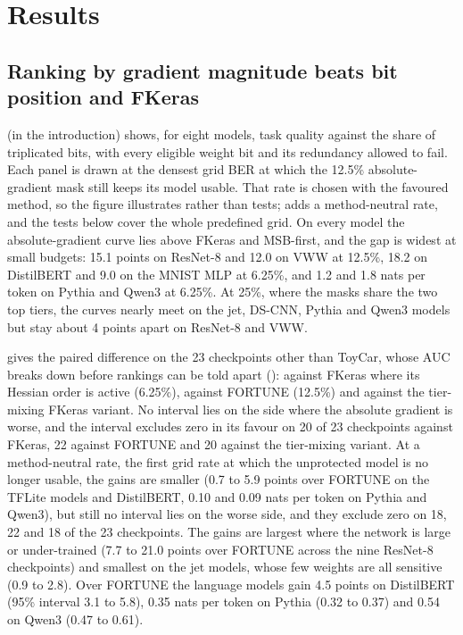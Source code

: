 \section{Results}\label{sec:results}
\subsection{Ranking by gradient magnitude beats bit position and FKeras}\label{sec:results-matters}\label{sec:default}
 (in the introduction) shows, for eight models, task quality against the share of triplicated bits, with every eligible weight bit and its redundancy allowed to fail. Each panel is drawn at the densest grid BER at which the 12.5\% absolute-gradient mask still keeps its model usable. That rate is chosen with the favoured method, so the figure illustrates rather than tests;  adds a method-neutral rate, and the tests below cover the whole predefined grid. On every model the absolute-gradient curve lies above FKeras and MSB-first, and the gap is widest at small budgets: 15.1 points on ResNet-8 and 12.0 on VWW at 12.5\%, 18.2 on DistilBERT and 9.0 on the MNIST MLP at 6.25\%, and 1.2 and 1.8 nats per token on Pythia and Qwen3 at 6.25\%. At 25\%, where the masks share the two top tiers, the curves nearly meet on the jet, DS-CNN, Pythia and Qwen3 models but stay about 4 points apart on ResNet-8 and VWW.

 gives the paired difference on the 23 checkpoints other than ToyCar, whose AUC breaks down before rankings can be told apart (): against FKeras where its Hessian order is active (6.25\%), against FORTUNE (12.5\%) and against the tier-mixing FKeras variant. No interval lies on the side where the absolute gradient is worse, and the interval excludes zero in its favour on 20 of 23 checkpoints against FKeras, 22 against FORTUNE and 20 against the tier-mixing variant. At a method-neutral rate, the first grid rate at which the unprotected model is no longer usable, the gains are smaller (0.7 to 5.9 points over FORTUNE on the TFLite models and DistilBERT, 0.10 and 0.09 nats per token on Pythia and Qwen3), but still no interval lies on the worse side, and they exclude zero on 18, 22 and 18 of the 23 checkpoints. The gains are largest where the network is large or under-trained (7.7 to 21.0 points over FORTUNE across the nine ResNet-8 checkpoints) and smallest on the jet models, whose few weights are all sensitive (0.9 to 2.8). Over FORTUNE the language models gain 4.5 points on DistilBERT (95\% interval 3.1 to 5.8), 0.35 nats per token on Pythia (0.32 to 0.37) and 0.54 on Qwen3 (0.47 to 0.61).

